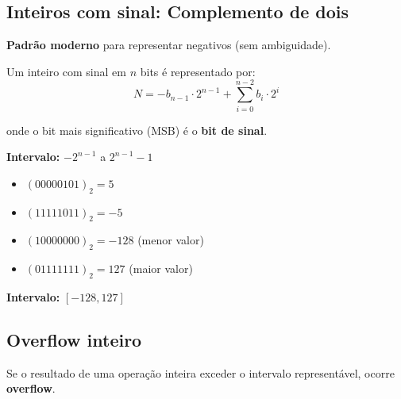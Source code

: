 \documentclass[
  11pt,
  letterpaper,
  DIV=11,
  numbers=noendperiod]{scrartcl}
\providecommand{\tightlist}{%
  \setlength{\itemsep}{0pt}\setlength{\parskip}{0pt}}
\begin{document}
\subsection{Inteiros com sinal: Complemento de
dois}\label{inteiros-com-sinal-complemento-de-dois}

\textbf{Padrão moderno} para representar negativos (sem ambiguidade).

Um inteiro com sinal em \(n\) bits é representado por:
\[N = -b_{n-1} \cdot 2^{n-1} + \sum_{i=0}^{n-2} b_i \cdot 2^i\]

onde o bit mais significativo (MSB) é o \textbf{bit de sinal}.

\textbf{Intervalo:} \(-2^{n-1}\) a \(2^{n-1} - 1\)

\begin{tcolorbox}[enhanced jigsaw, arc=.35mm, bottomrule=.15mm, bottomtitle=1mm, breakable, colback=white, colbacktitle=quarto-callout-tip-color!10!white, colframe=quarto-callout-tip-color-frame, coltitle=black, left=2mm, leftrule=.75mm, opacityback=0, opacitybacktitle=0.6, rightrule=.15mm, title=\textcolor{quarto-callout-tip-color}{\faLightbulb}\hspace{0.5em}{Exemplo com 8 bits}, titlerule=0mm, toprule=.15mm, toptitle=1mm]

\begin{itemize}
\tightlist
\item
  \((00000101)_2 = 5\)
\item
  \((11111011)_2 = -5\)
\item
  \((10000000)_2 = -128\) (menor valor)
\item
  \((01111111)_2 = 127\) (maior valor)
\end{itemize}

\textbf{Intervalo:} \([-128, 127]\)

\end{tcolorbox}

\subsection{Overflow inteiro}\label{overflow-inteiro}

Se o resultado de uma operação inteira exceder o intervalo
representável, ocorre \textbf{overflow}.
\end{document}
